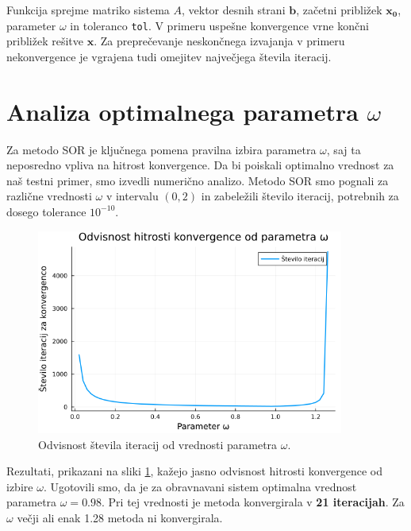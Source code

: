 \documentclass{article}
\begin{document}
Funkcija sprejme matriko sistema $A$, vektor desnih strani 
$\boldsymbol{b}$, začetni približek $\boldsymbol{x_0}$, parameter $\omega$ in 
toleranco \texttt{tol}. V primeru uspešne konvergence vrne končni približek 
rešitve $\boldsymbol{x}$. Za preprečevanje neskončnega izvajanja v primeru 
nekonvergence je vgrajena tudi omejitev največjega števila iteracij.

\section{Analiza optimalnega parametra \(\omega\)}
Za metodo SOR je ključnega pomena pravilna izbira parametra $\omega$, 
saj ta neposredno vpliva na hitrost konvergence. 
Da bi poiskali optimalno vrednost za naš testni primer, smo 
izvedli numerično analizo. Metodo SOR smo pognali za različne 
vrednosti $\omega$ v intervalu $(0, 2)$ in zabeležili število 
iteracij, potrebnih za dosego tolerance $10^{-10}$.

\begin{figure}[h!]
    \centering
    \includegraphics[width=0.9\textwidth]{sor_omega_konvergenca.png}
    \caption{Odvisnost števila iteracij od vrednosti parametra $\omega$.}
    \label{fig:sor_omega}
\end{figure}

Rezultati, prikazani na sliki \ref{fig:sor_omega}, kažejo jasno odvisnost
hitrosti konvergence od izbire $\omega$. Ugotovili smo, da je za 
obravnavani sistem optimalna vrednost parametra \textbf{$\omega = 0.98$}. 
Pri tej vrednosti je metoda konvergirala v \textbf{21 iteracijah}. Za $\omega$
večji ali enak 1.28 metoda ni konvergirala.
\end{document}
